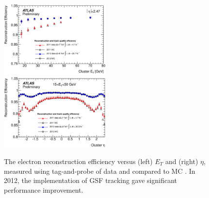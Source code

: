 \begin{figure}
	\includegraphics[width=0.495\textwidth]{tex/selection/el_recoeff_et}
	\hfill
	\includegraphics[width=0.495\textwidth]{tex/selection/el_recoeff_eta}
	\caption{The electron reconstruction efficiency versus (left) $E_T$ and (right) 
	$\eta$, measured using tag-and-probe of \HepProcess{\PZ \HepTo \Pe\Pe} data 
	and compared to MC \cite{ElectronPerf:2012}. In 2012, the implementation of GSF 
	tracking gave significant performance improvement.}
	\label{fig:objects:el_recoeff}
\end{figure}

